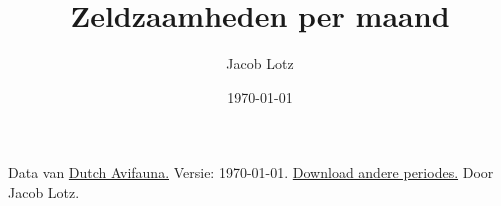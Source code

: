 \documentclass[11pt]{article}
\title{Zeldzaamheden per maand}
\author{Jacob Lotz}
\date{\today}
\begin{document}
\begin{center}
{\tiny
Data van \href{https://www.dutchavifauna.nl/}{Dutch Avifauna.} Versie: \today. \href{https://jlotz.stack.storage/s/targets/en}{Download andere periodes.} Door Jacob Lotz. 
}
\end{center}
\begin{multicols}{2}

	


\end{multicols}
\end{document}
